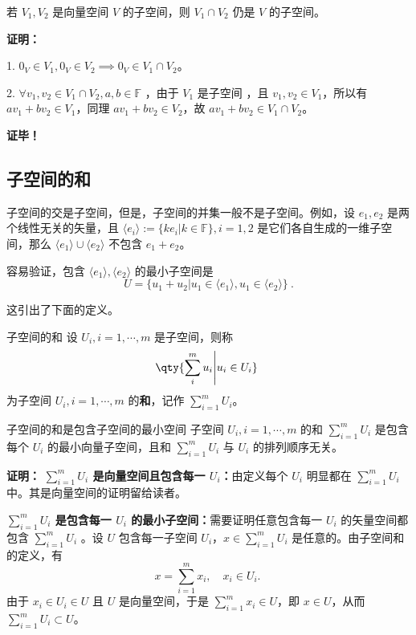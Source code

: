 \begin{theorem}{}\label{the_SubSpc_1}
若 $V_1, V_2$ 是向量空间 $V$ 的子空间，则 $V_1 \cap V_2$ 仍是 $V$ 的子空间。
\end{theorem}
\textbf{证明：}

1. $0_V \in V_1, 0_V \in V_2 \implies 0_V \in V_1 \cap V_2$。

2. $\forall v_1,v_2 \in V_1 \cap V_2, a, b \in \mathbb{F}$ ，由于 $V_1$ 是子空间 ，且 $v_1, v_2 \in V_1$，所以有 $a v_1 + b v_2 \in V_1$，同理 $a v_1 + b v_2 \in V_2$，故 $a v_1 + b v_2 \in V_1 \cap V_2$。

\textbf{证毕！}

\subsection{子空间的和}
子空间的交是子空间，但是，子空间的并集一般不是子空间。例如，设 $e_1,e_2$ 是两个线性无关的矢量，且 $\langle e_i\rangle:=\{k e_i|k\in\mathbb F\},i=1,2$ 是它们各自生成的一维子空间，那么 $\langle e_1\rangle\cup \langle e_2\rangle$ 不包含 $e_1+e_2$。

容易验证，包含 $\langle e_1\rangle,\langle e_2\rangle$ 的最小子空间是
\begin{equation}
U=\{u_1+u_2|u_1\in \langle e_1\rangle,u_1\in\langle e_2\rangle\}~.
\end{equation}

这引出了下面的定义。
\begin{definition}{子空间的和}\label{def_SubSpc_1}
设 $U_i,i=1,\cdots,m$ 是子空间，则称
\begin{equation}
\qty{\sum_{i}^m u_i\Bigg|u_i\in U_i}~
\end{equation}
为子空间 $U_i,i=1,\cdots,m$ 的\textbf{和}，记作 $\sum_{i=1}^m U_i$。
\end{definition}

\begin{theorem}{子空间的和是包含子空间的最小空间}
子空间 $U_i,i=1,\cdots,m$ 的和 $\sum_{i=1}^m U_i$ 是包含每个 $U_i$ 的最小向量子空间，且和 $\sum_{i=1}^m U_i$ 与 $U_i$ 的排列顺序无关。
\end{theorem}
\textbf{证明：} \textbf{$\sum_{i=1}^m U_i$ 是向量空间且包含每一 $U_i$：}由定义每个 $U_i$ 明显都在 $\sum_{i=1}^m U_i$ 中。其是向量空间的证明留给读者。

\textbf{$\sum_{i=1}^m U_i$ 是包含每一 $U_i$ 的最小子空间：}需要证明任意包含每一 $U_i$ 的矢量空间都包含 $\sum_{i=1}^m U_i$ 。设 $U$ 包含每一子空间 $U_i$，$x\in \sum_{i=1}^m U_i$ 是任意的。由子空间和的定义，有
\begin{equation}
x=\sum_{i=1}^m x_i,\quad x_i\in U_i.~
\end{equation}
由于 $x_i\in U_i\in U$ 且 $U$ 是向量空间，于是 $\sum_{i=1}^m x_i\in U$，即 $x\in U$，从而 $\sum_{i=1}^m U_i\subset U$。

